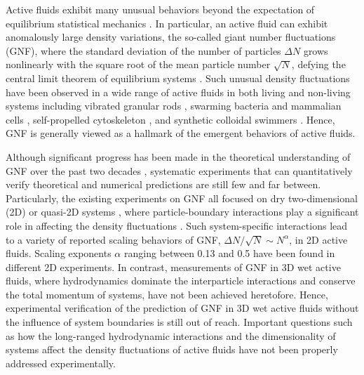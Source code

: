 \documentclass[twocolumn,aps,prx,amsmath,amssymb,longbibliography,superscriptaddress]{revtex4-2}
\begin{document}
Active fluids exhibit many unusual behaviors beyond the expectation of equilibrium statistical mechanics \cite{Ramaswamy2010,Cates2012,Marchetti2013,Poon2013,Elgeti2015}.
In particular, an active fluid can exhibit anomalously large density variations, the so-called giant number fluctuations (GNF), where the standard deviation of the number of particles $\Delta N$ grows nonlinearly with the square root of the mean particle number $\sqrt N$, defying the central limit theorem of equilibrium systems \cite{Mishin2015}.
Such unusual density fluctuations have been observed in a wide range of active fluids in both living and non-living systems including vibrated granular rods \cite{Narayan2007,Aranson2008,Kudrolli2008,Deseigne2010}, swarming bacteria \cite{Zhang2010,Nishiguchi2017} and mammalian cells \cite{Kawaguchi2017},
self-propelled cytoskeleton \cite{Schaller2013}, and synthetic colloidal swimmers \cite{Palacci2013,Karani2019}. Hence, GNF is generally viewed as a hallmark of the emergent behaviors of active fluids.


Although significant progress has been made in the theoretical understanding of GNF over the past two decades \cite{Toner1995, Tu1998, Toner1998, AditiSimha2002, Ramaswamy2003, Toner2005, Chate2008, Mishra2010, Dey2012, Saintillan2012, Saintillan2013, Ngo2014,  Mahault2019}, systematic experiments that can quantitatively verify theoretical and numerical predictions are still few and far between. Particularly, the existing experiments on GNF all focused on dry two-dimensional (2D) or quasi-2D systems \cite{Narayan2007, Aranson2008, Kudrolli2008, Deseigne2010, Zhang2010, Schaller2013, Nishiguchi2017, Kawaguchi2017, Palacci2013}, where particle-boundary interactions play a significant role in affecting the density fluctuations \cite{Marchetti2013}. Such system-specific interactions lead to a variety of reported scaling behaviors of GNF, $\Delta N/\sqrt N \sim N^\alpha$, in 2D active fluids. Scaling exponents $\alpha$ ranging between 0.13 and 0.5 have been found in different 2D experiments. In contrast, measurements of GNF in 3D wet active fluids, where hydrodynamics dominate the interparticle interactions and conserve the total momentum of systems, have not been achieved heretofore. Hence, experimental verification of the prediction of GNF in 3D wet active fluids without the influence of system boundaries is still out of reach. Important questions such as how the long-ranged hydrodynamic interactions and the dimensionality of systems affect the density fluctuations of active fluids have not been properly addressed experimentally.
\end{document}
